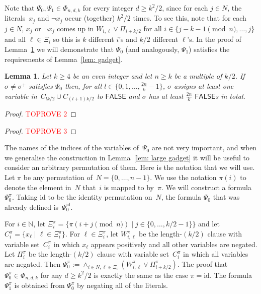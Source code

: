 \documentclass[11pt]{article}
\newtheorem{lemma}[theorem]{Lemma}
\theoremstyle{definition}
\theoremstyle{remark}
\def\id{\text{id}}
\def\FALSE{\mathsf{FALSE}}
\begin{document}
Note that $\Psi_0, \Psi_1 \in \Phi_{n,d,k}$ for every integer $d\geq k^2/2$,  
since for each $j\in N$, the literals~$x_j$ and $\neg x_j$ occur (together) $k^2/2$  times. To see this, 
note that for each $j\in N$, $x_j$ or $\neg x_j$ comes up in $W_{i,\ell} \vee \Pi_{i+k/2}$ for 
all $i\in \{j-k-1 \pmod n,\ldots,j\}$ and all $\ell \in  \Xi_i$ so this is $k$ different $i$'s and $k/2$ different $\ell$'s.  
In the proof of Lemma~\ref{lem:CoverGadget} we will demonstrate that  $\Psi_0$ (and analogously, $\Psi_1$) satisfies the requirements of Lemma~\ref{lem: gadget}.



 
\begin{lemma}\label{lem:CoverGadget}
Let $k\ge 4$ be an even integer and let $n\geq k$ be a multiple of $k/2$. 
If $\sigma \neq \sigma^+$ satisfies $\Psi_0$
then,  for all 
$l\in \{0,1,\ldots,\frac{2n}{k}-1\}$, 
$\sigma$ assigns at least one variable in~$C_{lk/2} \cup C_{(l+1)k/2}$ to $\FALSE$ and $\sigma$ has at least $\frac{2n}{k}$ $\FALSE$s in total.
\end{lemma}

\begin{proof}\textcolor{red}{TOPROVE 2}\end{proof}


\begin{proof}\textcolor{red}{TOPROVE 3}\end{proof}


 
 
 
 
  


   

 
 
  

  

 

The names of the indices of the variables of~$\Psi_0$ are not very important, and when we generalise the construction in Lemma~\ref{lem: large gadget} it will be useful to consider an arbitrary permutation of them.
Here is the notation that we will use.  
Let $\pi$ be any permutation of~$N=\{0,\ldots,n-1\}$. We use the notation $\pi(i)$ to denote the element in~$N$ that~$i$ is mapped to by~$\pi$.
We will construct a formula $\Psi_0^{\pi}$.
Taking $\id$ to be the identity permutation on~$N$, the formula $\Psi_0$ that was already defined is~$\Psi_0^{\id}$.


For $i\in  \mathbb{N}$, let
$\Xi_i^{\pi} = \{ \pi(i+j \pmod n) \mid j \in \{0,\ldots, k/2-1\} \}$ 
and let $C_i^{\pi} = \{x_\ell \mid \ell \in \Xi_i^{\pi}\}$.
For $\ell \in \Xi^{\pi}_i$, let $W_{i,\ell}^{\pi}$ be the length-$(k/2)$ clause with variable set~$C_i^{\pi}$ in which $x_\ell$ appears positively and all other variables are negated. 
Let $\Pi_i^{\pi}$ be the length-$(k/2)$ clause with variable set~$C_i^{\pi}$ in which all variables are negated. Then
$\Psi_0^\pi := \wedge_{i\in N, \ell \in \Xi_i} (W_{i,\ell}^\pi \vee \Pi^\pi_{i+k/2})$.  
The proof that $\Psi_0^{\pi}  \in \Phi_{n,d,k}$ for any $d\geq k^2/2$ is exactly the same as the case $\pi=\id$.
The formula $\Psi_1^\pi$ is obtained from $\Psi_0^\pi$ by negating all of the literals.
 
\end{document}
